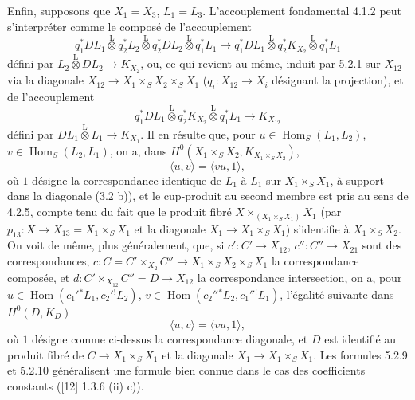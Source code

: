 \documentclass[11pt]{article}
\DeclareMathOperator{\Hom}{Hom}
\providecommand{\Hom}{\operatorname{Hom}}
\providecommand{\Hom}{\operatorname{Hom}}
\begin{document}
Enfin, supposons que $X_1=X_3$, $L_1=L_3$. L'accouplement fondamental 4.1.2 peut s'interpréter comme le composé de l'accouplement
\begin{equation}
\tag{5.2.7}
q_1^*DL_1\overset{\mathrm{L}}{\otimes}q_2^*L_2\overset{\mathrm{L}}{\otimes}q_2^*DL_2\overset{\mathrm{L}}{\otimes}q_1^*L_1
\longrightarrow
q_1^*DL_1\overset{\mathrm{L}}{\otimes}q_2^*K_{X_2}\overset{\mathrm{L}}{\otimes}q_1^*L_1
\end{equation}
défini par $L_2\overset{\mathrm{L}}{\otimes}DL_2\to K_{X_2}$, ou, ce qui revient au même, induit par 5.2.1 sur $X_{12}$ via la diagonale $X_{12}\to X_1\times_SX_2\times_SX_1$ ($q_i:X_{12}\to X_i$ désignant la projection), et de l'accouplement
\begin{equation}
\tag{5.2.8}
q_1^*DL_1\overset{\mathrm{L}}{\otimes}q_2^*K_{X_2}\overset{\mathrm{L}}{\otimes}q_1^*L_1\longrightarrow K_{X_{12}}
\end{equation}
défini par $DL_1\overset{\mathrm{L}}{\otimes}L_1\to K_{X_1}$. Il en résulte que, pour $u\in\Hom_S(L_1,L_2)$, $v\in\Hom_S(L_2,L_1)$, on a, dans $H^0(X_1\times_SX_2,K_{X_1\times_SX_2})$,
\begin{equation}
\tag{5.2.9}
\langle u,v\rangle=\langle vu,1\rangle,
\end{equation}
où $1$ désigne la correspondance identique de $L_1$ à $L_1$ sur $X_1\times_SX_1$, à support dans la diagonale (3.2 b)), et le cup-produit au second membre est pris au sens de 4.2.5, compte tenu du fait que le produit fibré $X\times_{(X_1\times_SX_1)}X_1$ (par $p_{13}:X\to X_{13}=X_1\times_SX_1$ et la diagonale $X_1\to X_1\times_SX_1$) s'identifie à $X_1\times_SX_2$. On voit de même, plus généralement, que, si $c':C'\to X_{12}$, $c'':C''\to X_{21}$
sont des correspondances, $c:C=C'\times_{X_2}C''\to X_1\times_SX_2\times_SX_1$ la 
correspondance composée, et $d:C'\times_{X_{12}}C''=D\to X_{12}$ la correspondance intersection, on a, pour $u\in\Hom(c_1'{}^*L_1,c_2'{}^!L_2)$, $v\in\Hom(c_2''{}^*L_2,c_1''{}^!L_1)$, l'égalité suivante dans $H^0(D,K_D)$
\begin{equation}
\tag{5.2.10}
\langle u,v\rangle=\langle vu,1\rangle,
\end{equation}
où $1$ désigne comme ci-dessus la correspondance diagonale, et $D$ est identifié au produit fibré de $C\to X_1\times_SX_1$ et la diagonale $X_1\to X_1\times_SX_1$. Les formules 5.2.9 et 5.2.10 généralisent une formule bien connue dans le cas des coefficients constants ([12] 1.3.6 (ii) c)).
\end{document}
